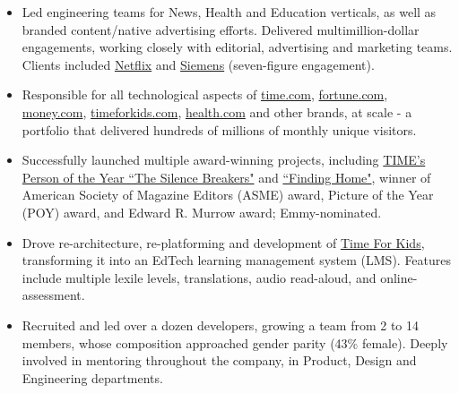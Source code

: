 \documentclass[a4paper,10pt]{memoir} %
\begin{document}
\begin{itemize}
	
	\item Led engineering teams for News, Health and Education verticals, as 
	well as branded content/native advertising efforts. Delivered 
	multimillion-dollar engagements, working closely with editorial, 
	advertising and marketing teams. Clients included \href{http://time.com/paid-content-from/netflix/dinnertime/}{Netflix} and \href{http://time.com/partner/siemens/innovation-starts-here/}{Siemens} (seven-figure 
	engagement).

	\item Responsible for all technological aspects of \href{http://time.com}
	{time.com}, \href{http://fortune.com}{fortune.com}, \href{http://money.com}{money.com}, \href{https://www.timeforkids.com}{
	timeforkids.com}, \href{https://www.health.com}{health.com} and other 
	brands, at scale - a portfolio that delivered hundreds of millions of 
	monthly unique visitors.

	\item Successfully launched multiple award-winning projects, including \href{http://time.com/time-person-of-the-year-2017-silence-breakers/}{
	TIME's Person of the Year ``The Silence Breakers"} and \href{http://time.com/finding-home/}{``Finding Home"}, winner of American 
	Society of Magazine Editors (ASME) award, Picture of the Year (POY) 
	award, and Edward R. Murrow award; Emmy-nominated.

	\item Drove re-architecture, re-platforming and development of \href{https://www.timeforkids}{Time For Kids}, transforming it into an EdTech 
	learning management system (LMS). Features include multiple lexile 
	levels, translations, audio read-aloud, and online-assessment.

	\item Recruited and led over a dozen developers, growing a team from 2 
	to 14 members, whose composition approached gender parity (43\% female). 
	Deeply involved in mentoring throughout the company, in Product, Design 
	and Engineering departments. 
\end{itemize}
\Sep %
\end{document}
